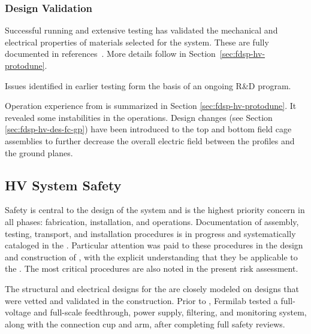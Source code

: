 \subsubsection{Design Validation}
\label{sec:fdsp-hv-des-des-val}

Successful  running and extensive testing has %
validated the mechanical and electrical properties of materials selected for the  system.  These are fully documented in references~\cite{bib:docdb2338, bib:docdb1504, bib:docdb1601}. More details follow in Section~\ref{sec:fdsp-hv-protodune}.


Issues identified in earlier testing form the basis of an ongoing R\&D program. 

Operation experience from  is summarized in Section \ref{sec:fdsp-hv-protodune}. It revealed some instabilities in the  operations.  Design changes (see Section \ref{sec:fdsp-hv-des-fc-gp}) have been introduced to the top and bottom field cage assemblies to further decrease the overall electric field between the profiles and the ground planes.


\subsection{HV System Safety}
\label{fdsp-hv-design-safety}

Safety is central to the design of the  system and is the highest priority concern in all phases: fabrication, installation, and operations. Documentation of assembly, testing, transport, and installation procedures is in progress and systematically cataloged in the . Particular attention was paid to these procedures in the design and construction of , with the explicit understanding that they be applicable to the . The most critical procedures are also noted in the present  risk assessment. 

The structural and electrical designs for the   are closely modeled on designs that were vetted and validated in the  construction. 
Prior to , Fermilab tested a full-voltage and full-scale  feedthrough, power supply, filtering, and monitoring system, along with the  connection cup and arm,  %
after completing full safety reviews. 

